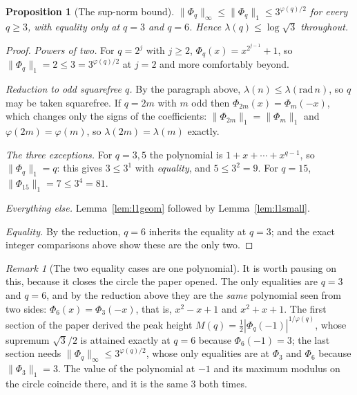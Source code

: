 \documentclass[11pt,a4paper]{article}
\theoremstyle{plain}
\newtheorem{proposition}[theorem]{Proposition}
\theoremstyle{definition}
\theoremstyle{remark}
\newtheorem{remark}[theorem]{Remark}
\begin{document}
\begin{proposition}[The sup-norm bound]\label{prop:supnorm}
$\|\Phi_q\|_\infty\le\|\Phi_q\|_1\le3^{\varphi(q)/2}$ for every $q\ge3$, with
equality only at $q=3$ and $q=6$. Hence $\lambda(q)\le\log\sqrt3$ throughout.
\end{proposition}

\begin{proof}
\emph{Powers of two.} For $q=2^{j}$ with $j\ge2$, $\Phi_q(x)=x^{2^{j-1}}+1$, so
$\|\Phi_q\|_1=2\le3=3^{\varphi(q)/2}$ at $j=2$ and more comfortably beyond.

\emph{Reduction to odd squarefree $q$.} By the paragraph above,
$\lambda(n)\le\lambda(\mathrm{rad}\,n)$, so $q$ may be taken squarefree. If
$q=2m$ with $m$ odd then $\Phi_{2m}(x)=\Phi_m(-x)$, which changes only the signs
of the coefficients: $\|\Phi_{2m}\|_1=\|\Phi_m\|_1$ and
$\varphi(2m)=\varphi(m)$, so $\lambda(2m)=\lambda(m)$ exactly.

\emph{The three exceptions.} For $q=3,5$ the polynomial is
$1+x+\cdots+x^{q-1}$, so $\|\Phi_q\|_1=q$: this gives $3\le3^{1}$ with
\emph{equality}, and $5\le3^{2}=9$. For $q=15$, $\|\Phi_{15}\|_1=7\le3^{4}=81$.

\emph{Everything else.} Lemma~\ref{lem:l1geom} followed by
Lemma~\ref{lem:l1small}.

\emph{Equality.} By the reduction, $q=6$ inherits the equality at $q=3$; and
the exact integer comparisons above show these are the only two.
\end{proof}

\begin{remark}[The two equality cases are one polynomial]\label{rem:onepoly}
It is worth pausing on this, because it closes the circle the paper opened.
The only equalities are $q=3$ and $q=6$, and by the reduction above they are the
\emph{same} polynomial seen from two sides: $\Phi_6(x)=\Phi_3(-x)$, that is,
$x^2-x+1$ and $x^2+x+1$. The first section of the paper derived the peak height
$M(q)=\tfrac12|\Phi_q(-1)|^{1/\varphi(q)}$, whose supremum $\sqrt3/2$ is
attained exactly at $q=6$ because $\Phi_6(-1)=3$; the last section needs
$\|\Phi_q\|_\infty\le3^{\varphi(q)/2}$, whose only equalities are at
$\Phi_3$ and $\Phi_6$ because $\|\Phi_3\|_1=3$. The value of the polynomial at
$-1$ and its maximum modulus on the circle coincide there, and it is the same
$3$ both times.
\end{remark}
\end{document}
